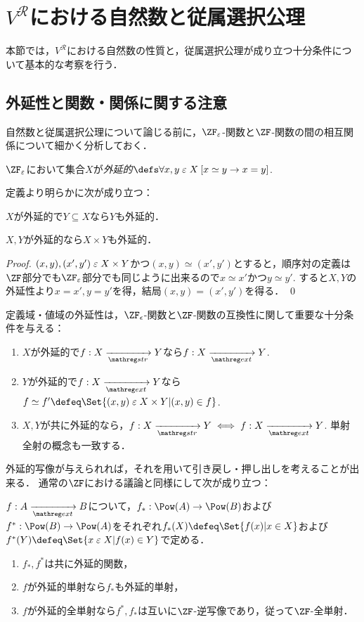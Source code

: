 \documentclass[realisability.tex]{subfiles}
\begin{document}
\section{$V^{\mathcal{R}}$における自然数と従属選択公理}
本節では，$V^{\mathcal{R}}$における自然数の性質と，従属選択公理が成り立つ十分条件について基本的な考察を行う．

\subsection{外延性と関数・関係に関する注意}
自然数と従属選択公理について論じる前に，$\ZFe$-関数と$\ZF$-関数の間の相互関係について細かく分析しておく．

\begin{definition}
 $\ZFe$において集合$X$が\emph{外延的}$\defs \forall x, y \strin X \: [x \simeq y \to x = y]$.
\end{definition}

定義より明らかに次が成り立つ：

\begin{lemma}
 $X$が外延的で$Y \subseteq X$なら$Y$も外延的．
\end{lemma}
\begin{lemma}
 $X, Y$が外延的なら$X \times Y$も外延的．
\end{lemma}
\begin{proof}
 $(x, y), (x', y') \mathrel{\varepsilon} X \times Y$かつ$(x, y) \simeq (x', y')$とすると，順序対の定義は$\ZF$部分でも$\ZFe$部分でも同じように出来るので$x \simeq x'$かつ$y \simeq y'$.
 すると$X, Y$の外延性より$x = x', y = y'$を得，結局$(x, y) = (x', y')$を得る． \qed
\end{proof}

定義域・値域の外延性は，$\ZF_\epsilon$-関数と$\ZF$-関数の互換性に関して重要な十分条件を与える：
\begin{lemma}
 \begin{enumerate}
  \item $X$が外延的で$f: X \strto Y$なら$f: X \extto Y$.
  \item $Y$が外延的で$f: X \extto Y$なら$f \simeq f' \defeq \Set{(x, y) \strin X \times Y | (x, y) \in f}$.
  \item $X, Y$が共に外延的なら，$f: X \strto Y \iff f: X \extto Y$. 単射全射の概念も一致する．
 \end{enumerate}
\end{lemma}

外延的写像が与えられれば，それを用いて引き戻し・押し出しを考えることが出来る．
通常の$\ZF$における議論と同様にして次が成り立つ：
\begin{lemma}
 $f: A \extto B$について，$f_*: \Pow(A) \to \Pow(B)$および$f^*: \Pow(B) \to \Pow(A)$をそれぞれ$f_*(X) \defeq \Set{ f(x) | x \in X }$および$f^*(Y) \defeq \Set{x \strin X | f(x) \in Y}$で定める．
 \begin{enumerate}
  \item $f_*, f^*$は共に外延的関数，
  \item $f$が外延的単射なら$f_*$も外延的単射，
  \item $f$が外延的全単射なら$f^*, f_*$は互いに$\ZF$-逆写像であり，従って$\ZF$-全単射．
 \end{enumerate}
\end{lemma}
\end{document}
